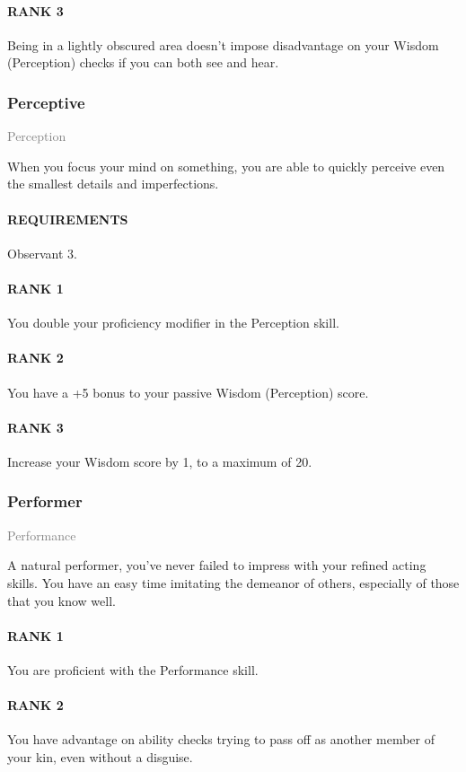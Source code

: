 \paragraph{RANK 3} Being in a lightly obscured area doesn't impose disadvantage on your Wisdom (Perception) checks if you can both see and hear.

\subsubsection{Perceptive} \label{feat::perceptive}
\small{\textcolor{gray}{Perception}}

\normalsize
When you focus your mind on something, you are able to quickly perceive even the smallest details and imperfections.
\paragraph{REQUIREMENTS} Observant 3.
\paragraph{RANK 1} You double your proficiency modifier in the Perception skill.
\paragraph{RANK 2} You have a +5 bonus to your passive Wisdom (Perception) score.
\paragraph{RANK 3} Increase your Wisdom score by 1, to a maximum of 20.

\subsubsection{Performer} \label{feat::performer}
\small{\textcolor{gray}{Performance}}

\normalsize
A natural performer, you've never failed to impress with your refined acting skills.
You have an easy time imitating the demeanor of others, especially of those that you know well.
\paragraph{RANK 1} You are proficient with the Performance skill.
\paragraph{RANK 2} You have advantage on ability checks trying to pass off as another member of your kin, even without a disguise.
